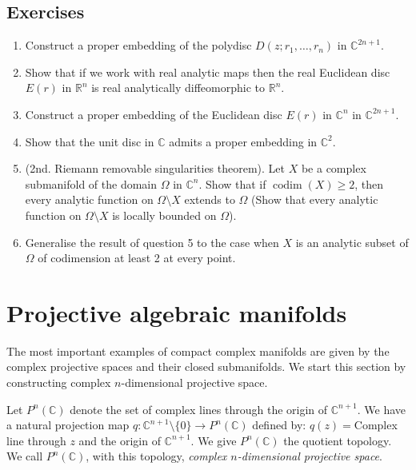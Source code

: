 \subsection*{Exercises}
\begin{enumerate}
\item Construct a proper embedding of the polydisc $D(z;r_1,\ldots,r_n)$ in $\mathbb C^{2n+1}$.
\item Show that if we work with real analytic maps then the real Euclidean disc $E(r)$ in $\mathbb R^n$ is real analytically diffeomorphic to $\mathbb R^n$.
\item[3*.] Construct a proper embedding of the Euclidean disc $E(r)$ in $\mathbb C^n$ in $\mathbb C^{2n+1}$.
\item[4*.] Show that the unit disc in $\mathbb C$ admits a proper embedding in $\mathbb C^2$.
\item[5.] (2nd. Riemann removable singularities theorem). Let $X$ be a complex submanifold of the domain $\Omega$ in $\mathbb C^n$. Show that if $\operatorname{codim}(X)\geq2$, then every analytic function on $\Omega\setminus X$ extends to $\Omega$ (Show that every analytic function on $\Omega\setminus X$ is locally bounded on $\Omega$).
\item[6*.] Generalise the result of question 5 to the case when $X$ is an analytic subset of $\Omega$ of codimension at least 2 at every point.
\end{enumerate}

\section{Projective algebraic manifolds}\label{sec:4:3}
The most important examples of compact complex manifolds are given by the complex projective spaces and their closed submanifolds. We start this section by constructing complex $n$-dimensional projective space.

Let $P^n(\mathbb C)$ denote the set of complex lines through the origin of $\mathbb C^{n+1}$. We have a natural projection map $q:\mathbb C^{n+1}\setminus\{0\}\longrightarrow P^n(\mathbb C)$ defined by: $q(z)={}$Complex line through $z$ and the origin of $\mathbb C^{n+1}$. We give $P^n(\mathbb C)$ the quotient topology. We call $P^n(\mathbb C)$, with this topology, \emph{complex $n$-dimensional projective space}.

